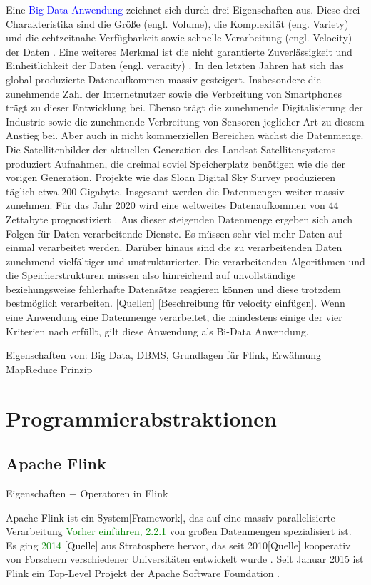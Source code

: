 Eine \textcolor{blue}{Big-Data Anwendung} zeichnet sich durch drei Eigenschaften aus. Diese drei Charakteristika sind die Größe (engl. Volume), die Komplexität (eng. Variety) und die echtzeitnahe Verfügbarkeit sowie schnelle Verarbeitung (engl. Velocity) der Daten \cite{Laney2001}. Eine weiteres Merkmal ist die nicht garantierte Zuverlässigkeit und Einheitlichkeit der Daten (engl. veracity) \cite{Zikopoulos2012}. 
In den letzten Jahren hat sich das global produzierte Datenaufkommen massiv gesteigert. Insbesondere die zunehmende Zahl der Internetnutzer sowie die Verbreitung von Smartphones trägt zu dieser Entwicklung bei. Ebenso trägt die zunehmende Digitalisierung der Industrie sowie die zunehmende Verbreitung von Sensoren jeglicher Art zu diesem Anstieg bei. Aber auch in nicht kommerziellen Bereichen wächst die Datenmenge. Die Satellitenbilder der aktuellen Generation des Landsat-Satellitensystems produziert Aufnahmen, die dreimal soviel Speicherplatz benötigen wie die der vorigen Generation. Projekte wie das Sloan Digital Sky Survey produzieren täglich etwa 200 Gigabyte. Insgesamt werden die Datenmengen weiter massiv zunehmen. Für das Jahr 2020 wird eine weltweites Datenaufkommen von 44 Zettabyte prognostiziert \cite{EMC2014}. Aus dieser steigenden Datenmenge ergeben sich auch Folgen für Daten verarbeitende Dienste. Es müssen sehr viel mehr Daten auf einmal verarbeitet werden. Darüber hinaus sind die zu verarbeitenden Daten zunehmend vielfältiger und unstrukturierter. Die verarbeitenden Algorithmen und die Speicherstrukturen müssen also hinreichend auf unvollständige beziehungsweise fehlerhafte Datensätze reagieren können und diese trotzdem bestmöglich verarbeiten. [Quellen] [Beschreibung für velocity einfügen].
Wenn eine Anwendung eine Datenmenge verarbeitet, die mindestens einige der vier Kriterien nach \cite{Laney2001} erfüllt, gilt diese Anwendung als Bi-Data Anwendung. 


Eigenschaften von: Big Data, DBMS, Grundlagen für Flink, Erwähnung MapReduce Prinzip

\section{Programmierabstraktionen}
\subsection{Apache Flink}
Eigenschaften + Operatoren in Flink

Apache Flink ist ein System[Framework], das auf eine massiv parallelisierte Verarbeitung \textcolor{green}{Vorher einführen, 2.2.1} von großen Datenmengen spezialisiert ist. Es ging \textcolor{green}{2014} [Quelle] aus Stratosphere hervor, das seit 2010[Quelle] kooperativ von Forschern verschiedener Universitäten entwickelt wurde \cite{Alexandrov2014}. Seit Januar 2015 ist Flink ein Top-Level Projekt der Apache Software Foundation \cite{ApacheFlinkBlogEntry}. 

